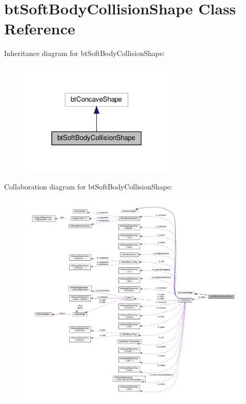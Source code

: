 \hypertarget{classbtSoftBodyCollisionShape}{}\section{bt\+Soft\+Body\+Collision\+Shape Class Reference}
\label{classbtSoftBodyCollisionShape}


Inheritance diagram for bt\+Soft\+Body\+Collision\+Shape\+:
\nopagebreak
\begin{figure}[H]
\begin{center}
\leavevmode
\includegraphics[width=211pt]{classbtSoftBodyCollisionShape__inherit__graph}
\end{center}
\end{figure}


Collaboration diagram for bt\+Soft\+Body\+Collision\+Shape\+:
\nopagebreak
\begin{figure}[H]
\begin{center}
\leavevmode
\includegraphics[width=350pt]{classbtSoftBodyCollisionShape__coll__graph}
\end{center}
\end{figure}
